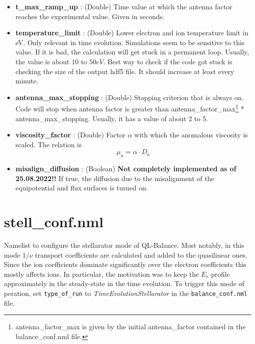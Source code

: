 \documentclass{article}
\begin{document}
\begin{itemize}
\begin{itemize}
		\item 0: standard ramp-up is used i.e. $antenna\_factor = antenna_\_factor_0 + time^2$
		\item 1: faster ramp-up. Is not stable though. Use 2 instead.
		\item 2: the antenna factor reaches its experimental value at \texttt{t\_max\_ramp\_up}
		\item 3: steady state mode. Goes up to antenna factor max and stays there for $10\cdot t\_max\_ramp\_up$.
		\item 4: no RMP mode. Antenna factor is set to zero. Code stops when time is $10\cdot t\_max\_ramp\_up$.
	\end{itemize}
	\item \textbf{t\_max\_ramp\_up} : (Double) Time value at which the antenna factor reaches the experimental value. Given in seconds.
	\item \textbf{temperature\_limit} : (Double) Lower electron and ion temperature limit in eV. Only relevant in time evolution. Simulations seem to be sensitive to this value. If it is bad, the calculation will get stuck in a permanent loop. Usually, the value is about $10$ to $50eV$. Best way to check if the code got stuck is checking the size of the output hdf5 file. It should increase at least every minute.
	\item \textbf{antenna\_max\_stopping} : (Double) Stopping criterion that is always on. Code will stop when antenna factor is greater than antenna\_factor\_max\footnote{antenna\_factor\_max is given by the initial antenna\_factor contained in the balance\_conf.nml file.} * antenna\_max\_stopping. Usually, it has a value of about 2 to 5.
	\item \textbf{viscosity\_factor} : (Double) Factor $\alpha$ with which the anomalous viscosity is scaled. The relation is 
	\begin{equation}
		\mu_a = \alpha \cdot D_a
	\end{equation}
	\item \textbf{misalign\_diffusion} : (Boolean) \textbf{Not completely implemented as of 25.08.2022!!} If true, the diffusion due to the misalignment of the equipotential and flux surfaces is turned on.

\end{itemize}

\section{stell\_conf.nml}
Namelist to configure the stellarator mode of QL-Balance. Most notably, in this mode $1/\nu$ transport coefficients are calculated and added to the quasilinear ones. Since the ion coefficients dominate significantly over the electron coefficients this mostly affects ions. In particular, the motivation was to keep the $E_r$ profile approximately in the steady-state in the time evolution. To trigger this mode of peration, set \texttt{type\_of\_run} to \textit{TimeEvolutionStellarator} in the \texttt{balance\_conf.nml} file.
\end{document}
